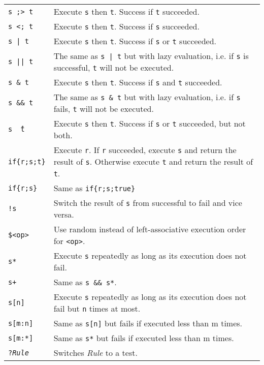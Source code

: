 \begin{table}[htbp]
\begin{minipage}{\linewidth} \renewcommand{\footnoterule}{} 
\begin{tabularx}{\linewidth}{|lX|}
\hline
\texttt{s ;> t} & Execute \texttt{s} then \texttt{t}. Success if \texttt{t} succeeded.\\
\texttt{s <; t} & Execute \texttt{s} then \texttt{t}. Success if \texttt{s} succeeded.\\
\texttt{s | t} & Execute \texttt{s} then \texttt{t}. Success if \texttt{s} or \texttt{t} succeeded.\\
\texttt{s || t} & The same as \texttt{s | t} but with lazy evaluation, i.e. if \texttt{s} is successful, \texttt{t} will not be executed.\\
\texttt{s \& t} & Execute \texttt{s} then \texttt{t}. Success if \texttt{s} and \texttt{t} succeeded.\\
\texttt{s \&\& t} & The same as \texttt{s \& t} but with lazy evaluation, i.e. if \texttt{s} fails, \texttt{t} will not be executed.\\
\texttt{s \^\ t} & Execute \texttt{s} then \texttt{t}. Success if \texttt{s} or \texttt{t} succeeded, but not both.\\
\texttt{if\{r;s;t\}} & Execute \texttt{r}. If \texttt{r} succeeded, execute \texttt{s} and return the result of \texttt{s}. Otherwise execute \texttt{t} and return the result of \texttt{t}.\\
\texttt{if\{r;s\}} & Same as \texttt{if\{r;s;true\}}\\
\texttt{!s} & Switch the result of \texttt{s} from successful to fail and vice versa.\\
\texttt{\$<op>} & Use random instead of left-associative execution order for \texttt{<op>}. \\
\texttt{s*} & Execute \texttt{s} repeatedly as long as its execution does not fail.\\
\texttt{s+} & Same as \texttt{s \&\& s*}.\\
\texttt{s[n]} & Execute \texttt{s} repeatedly as long as its execution does not fail but \texttt{n} times at most.\\
\texttt{s[m:n]} & Same as \texttt{s[n]} but fails if executed less than m times.\\
\texttt{s[m:*]} & Same as \texttt{s*} but fails if executed less than m times.\\
\texttt{?\emph{Rule}} & Switches \emph{Rule} to a test. \\

\end{tabularx}
\end{minipage}
\end{table}
